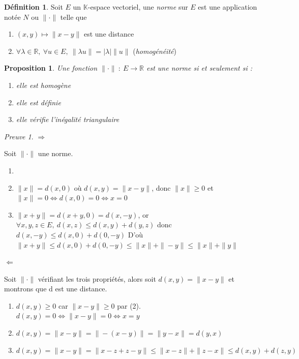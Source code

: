 \documentclass[]{article}
\newtheorem{myproposition}{Proposition}
\theoremstyle{remark}
\newtheorem{myproof}{Preuve}
\theoremstyle{definition}
\newtheorem{mydef}{Définition}
\begin{document}
\begin{mydef}
	Soit $E$ un $\mathbb{K}$-espace vectoriel, une \textit{norme} sur $E$ est une application notée $N$ ou $\|\cdot\|$ telle que
	\begin{enumerate}
		\item $(x, y) \longmapsto \|x - y\|$ est une distance
		\item $\forall \lambda \in \mathbb{R}, ~ \forall u \in E, ~ \|\lambda u\| = |\lambda|\|u\|$ (\textit{homogénéité})
	\end{enumerate}
\end{mydef}

\begin{myproposition}
	Une fonction $\|\cdot\| ~ : ~ E \longrightarrow \mathbb{R}$ est une norme si et seulement si :
	\begin{enumerate}
		\item elle est homogène
		\item elle est définie
		\item elle vérifie l'inégalité triangulaire
	\end{enumerate}
\end{myproposition}

\begin{myproof}
	\leavevmode
	
	{\boldmath $\Longrightarrow$}
	
	Soit $\|\cdot\|$ une norme.
	\begin{enumerate}
		\item \checkmark
		\item $\|x\|=d(x, 0)$ où $d(x,y)=\|x-y\|$, donc $\|x\| \geqslant 0$ et $\|x\|=0 \Longleftrightarrow d(x, 0)=0 \Longleftrightarrow x=0$
		\item $\|x+y\| = d(x+y, 0) = d(x, -y)$, or $\forall x, y, z \in E, ~ d(x, z) \leqslant d(x, y) + d(y, z)$ donc $d(x, -y) \leqslant d(x, 0) + d(0, -y)$
		D'où $\|x+y\| \leqslant d(x, 0) + d(0, -y) \leqslant \|x\| + \|-y\| \leqslant \|x\| + \|y\|$
	\end{enumerate}
	
	{\boldmath $\Longleftarrow$}
	
	Soit $\| \cdot \|$ vérifiant les trois propriétés, alors soit $d(x, y)=\|x-y\|$ et montrons que d est une distance.
	
	\begin{enumerate}
		\item $d(x, y) \geqslant 0$ car $\|x-y\| \geqslant 0$ par (2).
		$d(x, y) = 0 \Longleftrightarrow \|x-y\| = 0 \Longleftrightarrow x = y$
		
		\item $d(x, y) = \|x-y\|=\|-(x-y)\| = \|y-x\|=d(y, x)$
		
		\item $d(x, y) = \|x-y\| = \|x-z + z - y\| \leqslant \|x-z\| +\|z-x\| \leqslant d(x, y) + d(z, y)$
 	\end{enumerate}
\end{myproof}
\end{document}
